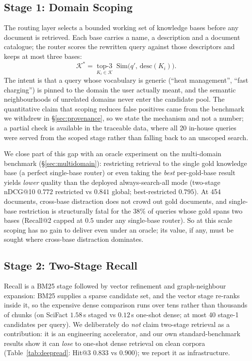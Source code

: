 \documentclass[sigconf, review, anonymous]{acmart}
\begin{document}
\subsection{Stage 1: Domain Scoping}\label{sec:routing}
The routing layer selects a bounded working set of knowledge bases before any
document is retrieved. Each base carries a name, a description and a document
catalogue; the router scores the rewritten query against those descriptors and
keeps at most three bases:
\begin{equation}
\mathcal{K}^{*} = \operatorname*{top\text{-}3}_{K_i \in \mathcal{K}}\;
   \mathrm{Sim}\bigl(q',\, \mathrm{desc}(K_i)\bigr).
\end{equation}
The intent is that a query whose vocabulary is generic (``heat management'',
``fast charging'') is pinned to the domain the user actually meant, and the
semantic neighbourhoods of unrelated domains never enter the candidate pool.
The quantitative claim that scoping reduces false positives came from the
benchmark we withdrew in \S\ref{sec:provenance}, so we state the mechanism and
not a number; a partial check is available in the traceable data, where all 20
in-house queries were served from the scoped stage rather than falling back to
an unscoped search.

We close part of this gap with an oracle experiment on the multi-domain
benchmark (\S\ref{sec:multidomain}): restricting retrieval to the single gold
knowledge base (a perfect single-base router) or even taking the \emph{best}
per-gold-base result yields \emph{lower} quality than the deployed
always-search-all mode (two-stage nDCG@10 $0.772$ restricted vs $0.841$ global;
best-restricted $0.795$). At 454 documents, cross-base distraction does not
crowd out gold documents, and single-base restriction is structurally fatal for
the $38\%$ of queries whose gold spans two bases (Recall@2 capped at $0.5$
under any single-base router). So at this scale scoping has no gain to deliver
even under an oracle; its value, if any, must be sought where cross-base
distraction dominates.

\subsection{Stage 2: Two-Stage Recall}\label{sec:recall}
Recall is a BM25 stage followed by vector refinement and graph-neighbour
expansion: BM25 supplies a sparse candidate set, and the vector stage re-ranks
inside it, so the expensive dense comparison runs over tens rather than
thousands of chunks (on SciFact $1.58$\,s staged vs $0.12$\,s one-shot dense;
at most 40 stage-1 candidates per query). We deliberately do \emph{not} claim
two-stage retrieval as a contribution: it is an engineering accelerator, and
our own standard-benchmark results show it can \emph{lose} to one-shot dense
retrieval on clean corpora (Table~\ref{tab:deepread}: Hit@3 $0.833$ vs
$0.900$); we report it as infrastructure.
\end{document}
